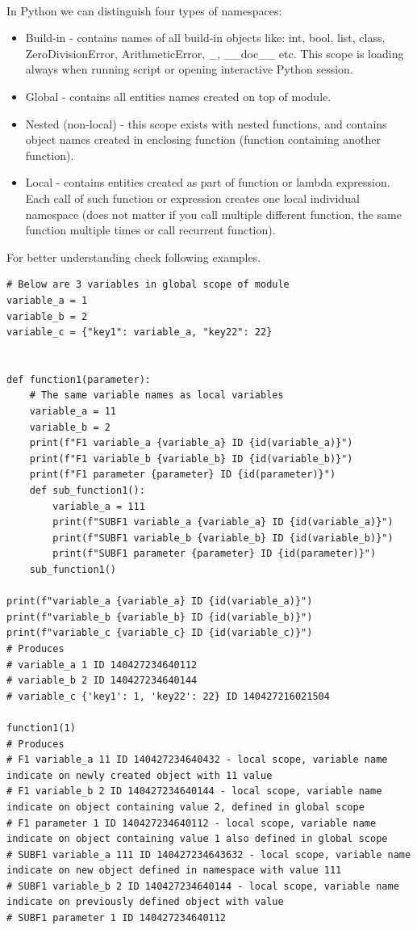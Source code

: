\documentclass{article}
\begin{document}
\paragraph{}
In Python we can distinguish four types of namespaces:
\begin{itemize}
\item Build-in - contains names of all build-in objects like: int, bool, list, class, ZeroDivisionError, ArithmeticError, \_, \_\_doc\_\_ etc. This scope is loading always when running script or opening interactive Python session. 
\item Global - contains all entities names created on top of module.
\item Nested (non-local) - this scope exists with nested functions, and contains object names created in enclosing function (function containing another function).
\item Local - contains entities created as part of function or lambda expression. Each call of such function or expression creates one local individual namespace (does not matter if you call multiple different function, the same function multiple times or call recurrent function).
\end{itemize}
For better understanding check following examples.
\begin{lstlisting}[style=pystyle]
# Below are 3 variables in global scope of module
variable_a = 1
variable_b = 2
variable_c = {"key1": variable_a, "key22": 22}


def function1(parameter):
	# The same variable names as local variables
    variable_a = 11
    variable_b = 2
    print(f"F1 variable_a {variable_a} ID {id(variable_a)}")
    print(f"F1 variable_b {variable_b} ID {id(variable_b)}")
    print(f"F1 parameter {parameter} ID {id(parameter)}")
    def sub_function1():
        variable_a = 111
        print(f"SUBF1 variable_a {variable_a} ID {id(variable_a)}")
        print(f"SUBF1 variable_b {variable_b} ID {id(variable_b)}")
        print(f"SUBF1 parameter {parameter} ID {id(parameter)}")
    sub_function1()

print(f"variable_a {variable_a} ID {id(variable_a)}")
print(f"variable_b {variable_b} ID {id(variable_b)}")
print(f"variable_c {variable_c} ID {id(variable_c)}")
# Produces
# variable_a 1 ID 140427234640112
# variable_b 2 ID 140427234640144
# variable_c {'key1': 1, 'key22': 22} ID 140427216021504

function1(1)
# Produces
# F1 variable_a 11 ID 140427234640432 - local scope, variable name indicate on newly created object with 11 value
# F1 variable_b 2 ID 140427234640144 - local scope, variable name indicate on object containing value 2, defined in global scope
# F1 parameter 1 ID 140427234640112 - local scope, variable name indicate on object containing value 1 also defined in global scope
# SUBF1 variable_a 111 ID 140427234643632 - local scope, variable name indicate on new object defined in namespace with value 111
# SUBF1 variable_b 2 ID 140427234640144 - local scope, variable name indicate on previously defined object with value 
# SUBF1 parameter 1 ID 140427234640112
\end{lstlisting}
\end{document}
